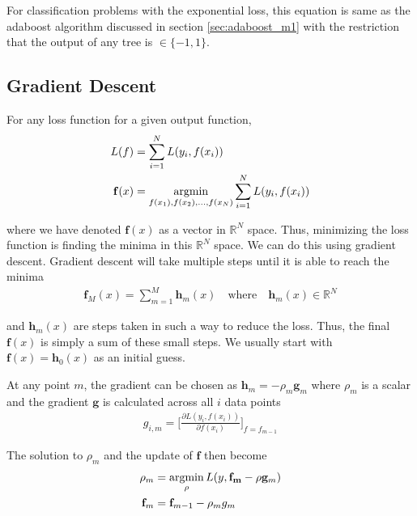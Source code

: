 \documentclass[../statistical_learning_notes.tex]{subfiles}
\begin{document}
For classification problems with the exponential loss, this equation is same as the adaboost algorithm discussed in section \ref{sec:adaboost_m1} with the restriction that the output of any tree is $\in \{-1,1\}$.

\subsection{Gradient Descent}
For any loss function for a given output function,
\begin{align*}
    L(f) &= \sum_{i=1}^{N} L(y_{i}, f(x_{i}))\\
    \mathbf{f}(x) &= \operatorname*{argmin}_{f(x_{1}), f(x_{2}), \ldots, f(x_{N})} \sum_{i=1}^{N} L(y_{i}, f(x_{i}))
\end{align*}

where we have denoted $\mathbf{f}(x)$ as a vector in $\mathbb{R}^{N}$ space. Thus, minimizing the loss function is finding the minima in this $\mathbb{R}^{N}$ space. We can do this using gradient descent. Gradient descent will take multiple steps until it is able to reach the minima
\begin{align*}
    \mathbf{f}_{M}(x) = \sum_{m=1}^{M} \mathbf{h}_{m}(x) \quad \text{where} \quad \mathbf{h}_{m}(x) \in \mathbb{R}^{N}
\end{align*}

and $\mathbf{h}_{m}(x)$ are steps taken in such a way to reduce the loss. Thus, the final $\mathbf{f}(x)$ is simply a sum of these small steps. We usually start with $\mathbf{f}(x) = \mathbf{h}_{0}(x)$ as an initial guess.\newline

At any point $m$, the gradient can be chosen as $\mathbf{h}_{m} = -\rho_{m} \mathbf{g}_{m}$ where $\rho_{m}$ is a scalar and the gradient $\mathbf{g}$ is calculated across all $i$ data points
\begin{align*}
    g_{i, m} = \bigg[ \frac{\partial L(y_{i}, f(x_{i}))}{\partial f(x_{i})} \bigg]_{f=f_{m-1}}
\end{align*}

The solution to $\rho_{m}$ and the update of $\mathbf{f}$ then become
\begin{align*}
    \rho_{m} &= \operatorname*{argmin}_{\rho} L(y, \mathbf{f_{m}} - \rho \mathbf{g}_{m})\\
    \mathbf{f}_{m} &= \mathbf{f}_{m-1} - \rho_{m} g_{m}
\end{align*}
\end{document}
